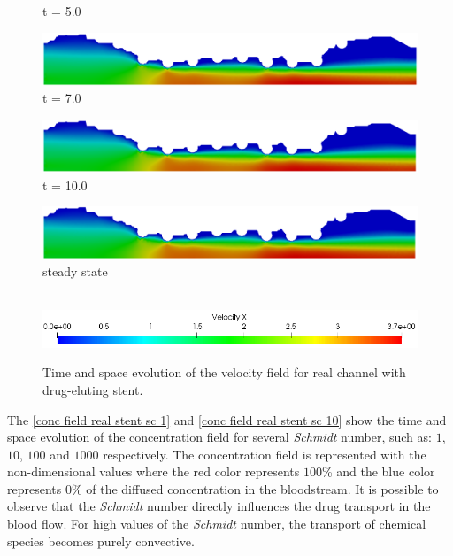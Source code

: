 \begin{figure}[H]
\begin{minipage}{.50\linewidth}
      t = 5.0
     \end{minipage}%
     \begin{minipage}{.50\linewidth}
      \centering
      \includegraphics[scale=0.18]{./02_chaps/cap_solution/figure/vel_RealStrut6.png}\\
      t = 7.0
     \end{minipage}
     \begin{minipage}{.50\linewidth}
     \medskip
      \centering
      \includegraphics[scale=0.18]{./02_chaps/cap_solution/figure/vel_RealStrut7.png}\\
      t = 10.0
     \end{minipage}%
     \begin{minipage}{.50\linewidth}
     \medskip
      \centering
      \includegraphics[scale=0.18]{./02_chaps/cap_solution/figure/vel_RealStrut8.png}\\
      steady state
     \end{minipage}\\[10pt]
      \centering
      \includegraphics[scale=0.5]{./02_chaps/cap_solution/figure/vel_RealStrutScale.png}\\
     \medskip
     \caption{
Time and space evolution of the velocity field for real channel with
drug-eluting stent.}
     \label{velocity field real stent}
\end{figure}





\vspace{1cm}
The \ref{conc field real stent sc 1} and 
\ref{conc field real stent sc 10} show the time and space evolution 
of the concentration field for several \textit{Schmidt} number, 
such as: $1$, $10$, $100$ and $1000$ respectively. The concentration field is 
represented with the non-dimensional values where the red color 
represents $100$\% and the blue color represents $0$\% 
of the diffused concentration in the bloodstream. 
It is possible to observe that the \textit{Schmidt} number directly 
influences the drug transport in the blood flow. 
For high values of the \textit{Schmidt} number, 
the transport of chemical species becomes purely convective.


